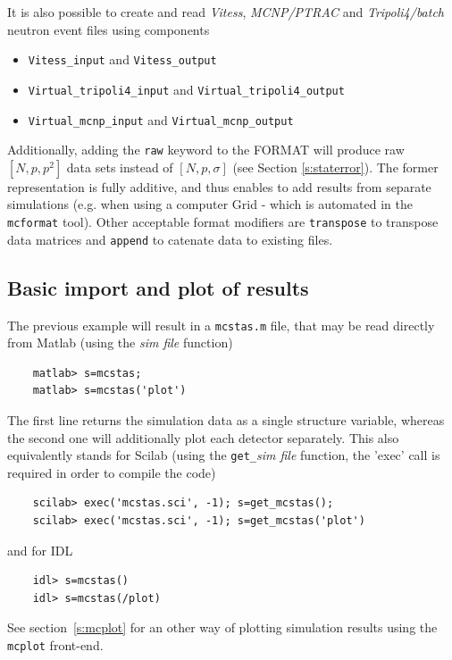 It is also possible to create and read \textit{Vitess}, \textit{MCNP/PTRAC} and \textit{Tripoli4/batch}
neutron event files using components
\begin{itemize}
\item \verb+Vitess_input+ and \verb+Vitess_output+
\item \verb+Virtual_tripoli4_input+ and \verb+Virtual_tripoli4_output+
\item \verb+Virtual_mcnp_input+ and \verb+Virtual_mcnp_output+
\end{itemize}  

Additionally, adding the \texttt{raw} keyword to the FORMAT will produce raw $[N, p, p^2]$ data sets instead of $[N, p, \sigma]$ (see Section \ref{s:staterror}). The former representation is fully additive, and thus enables to add results from separate simulations (e.g. when using a computer Grid - which is automated in the \verb+mcformat+ tool). Other acceptable format modifiers are \verb+transpose+ to transpose data matrices and \verb+append+ to catenate data to existing files.

\subsection{Basic import and plot of results}
\label{s:run-format}
The previous example will result in a \verb+mcstas.m+ file, that may be read directly from Matlab (using the {\it sim file} function)
\begin{verbatim}
    matlab> s=mcstas;
    matlab> s=mcstas('plot')
\end{verbatim} 
The first line returns the simulation data as a single structure variable, whereas the second one will additionally plot each detector separately.
This also equivalently stands for Scilab (using the \verb+get_+{\it sim file} function, the 'exec' call is required in order to compile the code)
\begin{verbatim}
    scilab> exec('mcstas.sci', -1); s=get_mcstas();
    scilab> exec('mcstas.sci', -1); s=get_mcstas('plot')
\end{verbatim} 
and for IDL
\begin{verbatim}
    idl> s=mcstas()
    idl> s=mcstas(/plot)
\end{verbatim} 
See section~\ref{s:mcplot} for an other way of plotting simulation results using the \verb+mcplot+ front-end. 

